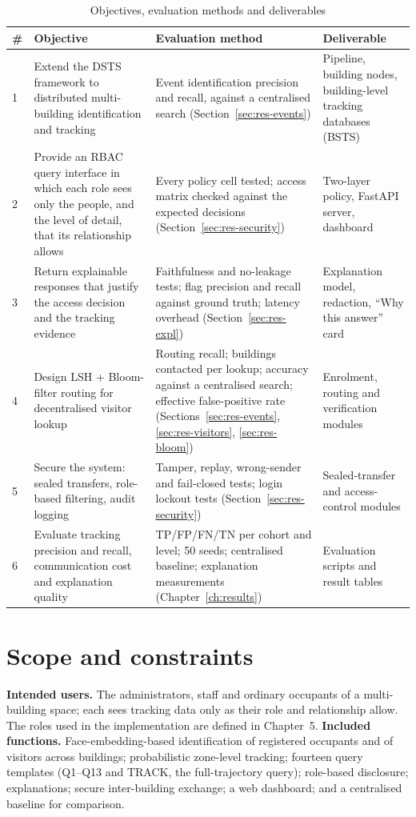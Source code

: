 \documentclass[12pt,a4paper,oneside]{report}
\begin{document}
\begin{table}[htbp]
\centering
\caption{Objectives, evaluation methods and deliverables}\label{tab:objectives}
{\small\setlength{\tabcolsep}{4pt}\renewcommand{\arraystretch}{1.2}
\begin{tabular}{|p{0.6cm}|p{4.4cm}|p{5.2cm}|p{3.6cm}|}\hline
\textbf{\#} & \textbf{Objective} & \textbf{Evaluation method} & \textbf{Deliverable}\\\hline
1 & Extend the DSTS framework to distributed multi-building identification and tracking & Event identification precision and recall, against a centralised search (Section~\ref{sec:res-events}) & Pipeline, building nodes, building-level tracking databases (BSTS)\\\hline
2 & Provide an RBAC query interface in which each role sees only the people, and the level of detail, that its relationship allows & Every policy cell tested; access matrix checked against the expected decisions (Section~\ref{sec:res-security}) & Two-layer policy, FastAPI server, dashboard\\\hline
3 & Return explainable responses that justify the access decision and the tracking evidence & Faithfulness and no-leakage tests; flag precision and recall against ground truth; latency overhead (Section~\ref{sec:res-expl}) & Explanation model, redaction, ``Why this answer'' card\\\hline
4 & Design LSH + Bloom-filter routing for decentralised visitor lookup & Routing recall; buildings contacted per lookup; accuracy against a centralised search; effective false-positive rate (Sections~\ref{sec:res-events}, \ref{sec:res-visitors}, \ref{sec:res-bloom}) & Enrolment, routing and verification modules\\\hline
5 & Secure the system: sealed transfers, role-based filtering, audit logging & Tamper, replay, wrong-sender and fail-closed tests; login lockout tests (Section~\ref{sec:res-security}) & Sealed-transfer and access-control modules\\\hline
6 & Evaluate tracking precision and recall, communication cost and explanation quality & TP/FP/FN/TN per cohort and level; 50 seeds; centralised baseline; explanation measurements (Chapter~\ref{ch:results}) & Evaluation scripts and result tables\\\hline
\end{tabular}}
\end{table}

\section{Scope and constraints}
\textbf{Intended users.} The administrators, staff and ordinary occupants of a multi-building space; each sees tracking data only as their role and relationship allow. The roles used in the implementation are defined in Chapter~5. \textbf{Included functions.} Face-embedding-based identification of registered occupants and of visitors across buildings; probabilistic zone-level tracking; fourteen query templates (Q1--Q13 and TRACK, the full-trajectory query); role-based disclosure; explanations; secure inter-building exchange; a web dashboard; and a centralised baseline for comparison.
\end{document}
